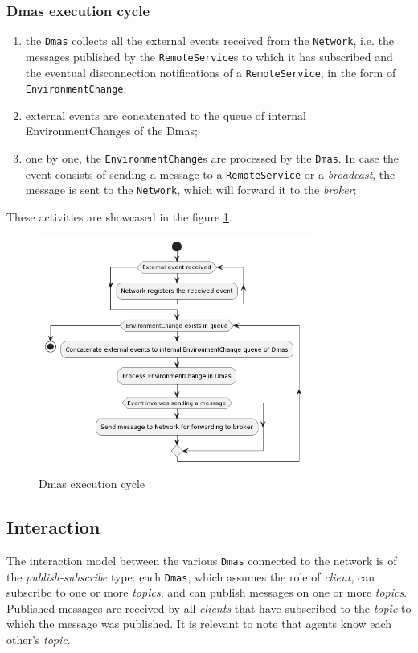 \subsubsection{Dmas execution cycle}

\begin{enumerate}
    \item the \texttt{Dmas} collects all the external events received from the \texttt{Network}, i.e. the messages published by the \texttt{RemoteService}s to which it has subscribed and the eventual disconnection notifications of a \texttt{RemoteService}, in the form of \texttt{EnvironmentChange};
    \item external events are concatenated to the queue of internal EnvironmentChanges of the Dmas;
    \item one by one, the \texttt{EnvironmentChange}s are processed by the \texttt{Dmas}. In case the event consists of sending a message to a \texttt{RemoteService} or a \textit{broadcast}, the message is sent to the \texttt{Network}, which will forward it to the \textit{broker};
\end{enumerate}

These activities are showcased in the figure \ref{fig:execution}.

\begin{figure}
    \centering
    \includegraphics[width=0.8\textwidth]{figures/activity-applychanges.png}
    \caption{Dmas execution cycle}
    \label{fig:execution}
\end{figure}

\subsection{Interaction}
The interaction model between the various \texttt{Dmas} connected to the network is of the \textit{publish-subscribe} type: each \texttt{Dmas}, which assumes the role of \textit{client}, can subscribe to one or more \textit{topics}, and can publish messages on one or more \textit{topics}.
Published messages are received by all \textit{clients} that have subscribed to the \textit{topic} to which the message was published.
It is relevant to note that agents know each other's \textit{topic}.


